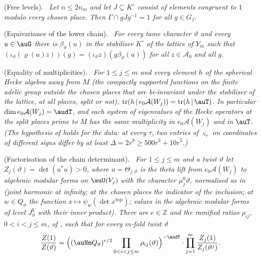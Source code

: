 \documentclass[10pt]{amsart}
\theoremstyle{definition}
\theoremstyle{remark}
\newcommand{\Z}{\mathbb Z}
\providecommand{\auAz}{\mathcal A_0}
\newenvironment{quotedthm}[2]{\par\medskip\noindent\begingroup
  \textbf{#1}#2.\ \itshape\ignorespaces}{\endgroup\par\medskip}
\begin{document}
\begin{quotedthm}{\cite[Lemma~14.5]{P46}}{ (Free levels)}
Let $n\le2n_m$ and let $J\subseteq K^\circ$ consist of elements congruent to $1$ modulo every
chosen place. Then $\Gamma\cap gJg^{-1}=1$ for all $g\in G_f$.
\end{quotedthm}

\begin{quotedthm}{\cite[Proposition~14.27]{P46}}{ (Equivariance of the lower chain)}
For every tame character $\vartheta$ and every $u\in\auG$ there is $\beta_\vartheta(u)$ in the
stabiliser $K^\circ$ of the lattice of $Y_m$ such
that $(\iota_\vartheta(\varrho(u)z))(g)=(\iota_\vartheta z)(g\beta_\vartheta(u))$ for all
$z\in\auAz$ and all $g$.
\end{quotedthm}

\begin{quotedthm}{\cite[Proposition~14.36]{P46}}{ (Equality of multiplicities)}
For $1\le j\le m$ and every element $h$ of the spherical Hecke algebra away from $M$ (the
compactly supported functions on the finite adelic group outside the chosen places that are
bi-invariant under the stabiliser of the lattice, at all places, split or not),
$\operatorname{tr}(h\,|\,e_0\mathcal A(W_j))=\operatorname{tr}(h\,|\,\auT)$. In particular
$\dim e_0\mathcal A(W_j)=\audT$, and each system of eigenvalues of the Hecke operators at the split
places prime to $M$ has the same multiplicity in $e_0\mathcal A(W_j)$ and in $\auT$. (The
hypothesis of {\cite[Proposition~4.6]{P51}} holds for the data: at every $\tau$, two entries of
$\varsigma_\tau$ on coordinates of different signs {\cite[(43)]{P51}} differ by at least
$\Delta=2r^8\ge500r^3+10r^5$.)
\end{quotedthm}

\begin{quotedthm}{\cite[Proposition~14.37]{P46}}{ (Factorisation of the chain determinant)}
For $1\le j\le m$ and a twist $\vartheta$ let $Z_j(\vartheta)=\det(u^*u)>0$, where
$u=\Theta_{j,\vartheta}$ is the theta lift from $e_0\mathcal A(W_j)$ to algebraic modular forms on
$\auU(V_j)$ with the character $\mu_j^0\vartheta$, normalised as in {\cite[\S2.4]{P53}} (joint
harmonic at infinity; at the chosen places the indicator of the inclusion; at $w\in Q_\vartheta$
the function $x\mapsto\psi_w(\det x^{\mathrm{top}})$; values in the algebraic modular forms of level
$J^V_\vartheta$ with their inner product). There are $e\in\Z$ and the ramified ratios $\rho_{ij}$,
$0<i<j\le m$, of {\cite[(9)]{P53}}, such that
for every $m$-fold twist $\vartheta$
\[
\frac{Z(1)}{Z(\vartheta)}=\Bigl((\auNm Q_\vartheta)^{e/2}\prod_{0<i<j\le m}\rho_{ij}(\vartheta)
\Bigr)^{-\audT}\cdot\prod_{j=1}^m\frac{Z_j(1)}{Z_j(\vartheta^j)} .
\]
\end{quotedthm}
\end{document}

